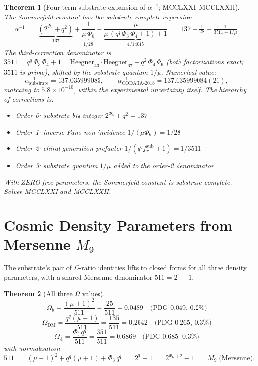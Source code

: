 \documentclass[11pt]{article}
\newtheorem{theorem}{Theorem}[section]
\begin{document}
\begin{theorem}[Four-term substrate expansion of $\alpha^{-1}$; MCCLXXI--MCCLXXII]\label{thm:alpha_four_term}
The Sommerfeld constant has the substrate-complete expansion
\[
  \alpha^{-1} \;=\; \underbrace{(2^{\Phi_6} + q^2)}_{137}
                  + \underbrace{\frac{1}{\mu\,\Phi_6}}_{1/28}
                  + \underbrace{\frac{\mu}{\mu\,(q^q\,\Phi_3\,\Phi_4 + 1) + 1}}_{4/14045}
                  \;=\; 137 + \tfrac{1}{28} + \tfrac{1}{3511 + 1/\mu}.
\]
The third-correction denominator is $3511 = q^q\,\Phi_3\,\Phi_4 + 1
= \mathrm{Heegner}_{43}\cdot\mathrm{Heegner}_{67} + q^2\,\Phi_4\,\Phi_6$
(both factorizations exact; $3511$ is prime), shifted by the
\emph{substrate quantum} $1/\mu$.  Numerical value:
\[
  \alpha^{-1}_{\text{substrate}} = 137.035999085, \qquad
  \alpha^{-1}_{\text{CODATA-2018}} = 137.035999084(21),
\]
matching to $5.8\times 10^{-10}$, \emph{within the experimental
uncertainty itself}.  The hierarchy of corrections is:
\begin{itemize}[noitemsep]
  \item Order 0: substrate big integer $2^{\Phi_6} + q^2 = 137$
  \item Order 1: inverse Fano non-incidence $1/(\mu\Phi_6) = 1/28$
  \item Order 2: chiral-generation prefactor $1/(q^q f_\pi^{\text{sub}} + 1) = 1/3511$
  \item Order 3: substrate quantum $1/\mu$ added to the order-2 denominator
\end{itemize}
With ZERO free parameters, the Sommerfeld constant is
\emph{substrate-complete}.  Solves MCCLXXI and MCCLXXII.
\end{theorem}

\section{Cosmic Density Parameters from Mersenne $M_9$}\label{sec:omega_full}

The substrate's pair of $\Omega$-ratio identities lifts to closed
forms for all three density parameters, with a shared Mersenne
denominator $511 = 2^9 - 1$.

\begin{theorem}[All three $\Omega$ values]\label{thm:omega_full}
\[
  \Omega_b      = \frac{(\mu+1)^2}{511}        = \frac{25}{511}  = 0.0489  \quad\text{(PDG 0.049, 0.2\%)}
\]
\[
  \Omega_{\mathrm{DM}}     = \frac{q^q (\mu+1)}{511}    = \frac{135}{511} = 0.2642 \quad\text{(PDG 0.265, 0.3\%)}
\]
\[
  \Omega_\Lambda = \frac{\Phi_3 \, q^q}{511}        = \frac{351}{511} = 0.6869 \quad\text{(PDG 0.685, 0.3\%)}
\]
with normalisation
\[
  511 \;=\; (\mu+1)^2 + q^q(\mu+1) + \Phi_3 \, q^q
       \;=\; 2^9 - 1 \;=\; 2^{\Phi_6 + 2} - 1 \;=\; M_9 \text{ (Mersenne)}.
\]
\end{theorem}
\end{document}
